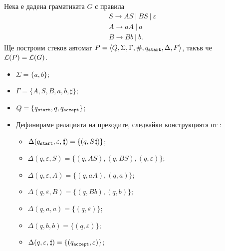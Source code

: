 \begin{extra}
\begin{example}
  Нека е дадена граматиката $G$ с правила 
  \begin{align*}
    & S \to AS\ |\ BS\ |\ \varepsilon\\
    & A \to aA\ |\ a\\
    & B \to Bb\ |\ b.
  \end{align*}
  Ще построим стеков автомат $P = \langle{Q,\Sigma,\Gamma,\#,q_{\texttt{start}},\Delta,F}\rangle$, такъв че $\mathcal{L}(P) = \mathcal{L}(G)$.
  \begin{itemize}
  \item
    $\Sigma = \{a,b\}$;
  \item 
    $\Gamma = \{A,S,B,a,b,\sharp\}$;
  \item
    $Q = \{q_{\texttt{start}},q,q_{\texttt{accept}}\}$;
  \item
    Дефинираме релацията на преходите, следвайки конструкцията от :
    \begin{itemize}
    \item
      $\Delta(q_{\texttt{start}}, \varepsilon, \sharp) = \{(q, S\sharp)\}$;
    \item 
      $\Delta(q, \varepsilon, S) = \{(q, AS), (q, BS), (q, \varepsilon)\}$;
    \item
      $\Delta(q, \varepsilon, A) = \{(q, aA), (q, a)\}$;
    \item
      $\Delta(q, \varepsilon, B) = \{(q, Bb), (q, b)\}$;
    \item
      $\Delta(q, a, a) = \{(q, \varepsilon)\}$;
    \item
      $\Delta(q, b, b) = \{(q, \varepsilon)\}$;
    \item
      $\Delta(q, \varepsilon, \sharp) = \{(q_{\texttt{accept}},\varepsilon)\}$;
    \end{itemize}
  \end{itemize}
\end{example}
\end{extra}

